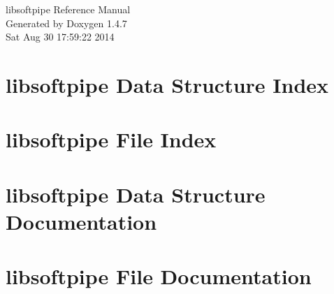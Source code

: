 \documentclass[letterpaper]{book}
\begin{document}
\begin{titlepage}
\vspace*{7cm}
\begin{center}
{\Large libsoftpipe Reference Manual}\\
\vspace*{1cm}
{\large Generated by Doxygen 1.4.7}\\
\vspace*{0.5cm}
{\small Sat Aug 30 17:59:22 2014}\\
\end{center}
\end{titlepage}
\clearemptydoublepage
{}
\tableofcontents
\clearemptydoublepage
{}
\chapter{libsoftpipe Data Structure Index}

\chapter{libsoftpipe File Index}

\chapter{libsoftpipe Data Structure Documentation}






\chapter{libsoftpipe File Documentation}





















\printindex
\end{document}
